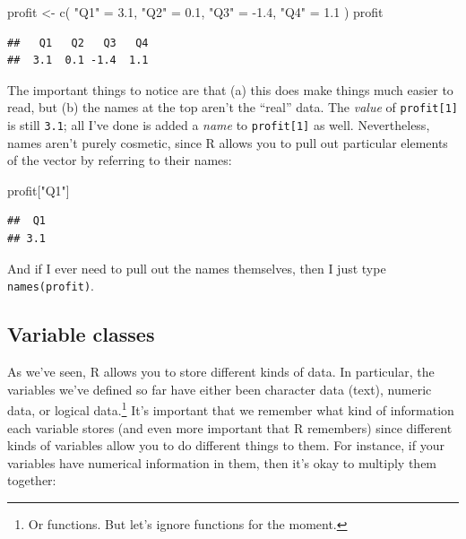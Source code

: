 \documentclass[
]{book}
\newenvironment{Shaded}{\begin{snugshade}}{\end{snugshade}}
\newcommand{\FloatTok}[1]{\textcolor[rgb]{0.00,0.00,0.81}{#1}}
\newcommand{\FunctionTok}[1]{\textcolor[rgb]{0.00,0.00,0.00}{#1}}
\newcommand{\NormalTok}[1]{#1}
\newcommand{\OtherTok}[1]{\textcolor[rgb]{0.56,0.35,0.01}{#1}}
\newcommand{\SpecialCharTok}[1]{\textcolor[rgb]{0.00,0.00,0.00}{#1}}
\newcommand{\StringTok}[1]{\textcolor[rgb]{0.31,0.60,0.02}{#1}}
\begin{document}
\begin{Shaded}
\begin{Highlighting}[]
\NormalTok{profit }\OtherTok{\textless{}{-}} \FunctionTok{c}\NormalTok{( }\StringTok{"Q1"} \OtherTok{=} \FloatTok{3.1}\NormalTok{, }\StringTok{"Q2"} \OtherTok{=} \FloatTok{0.1}\NormalTok{, }\StringTok{"Q3"} \OtherTok{=} \SpecialCharTok{{-}}\FloatTok{1.4}\NormalTok{, }\StringTok{"Q4"} \OtherTok{=} \FloatTok{1.1}\NormalTok{ )}
\NormalTok{profit}
\end{Highlighting}
\end{Shaded}

\begin{verbatim}
##   Q1   Q2   Q3   Q4 
##  3.1  0.1 -1.4  1.1
\end{verbatim}

The important things to notice are that (a) this does make things much easier to read, but (b) the names at the top aren't the ``real'' data. The \emph{value} of \texttt{profit{[}1{]}} is still \texttt{3.1}; all I've done is added a \emph{name} to \texttt{profit{[}1{]}} as well. Nevertheless, names aren't purely cosmetic, since R allows you to pull out particular elements of the vector by referring to their names:

\begin{Shaded}
\begin{Highlighting}[]
\NormalTok{profit[}\StringTok{"Q1"}\NormalTok{]}
\end{Highlighting}
\end{Shaded}

\begin{verbatim}
##  Q1 
## 3.1
\end{verbatim}

And if I ever need to pull out the names themselves, then I just type \texttt{names(profit)}.

\hypertarget{variable-classes}{%
\subsection{Variable classes}\label{variable-classes}}

As we've seen, R allows you to store different kinds of data. In particular, the variables we've defined so far have either been character data (text), numeric data, or logical data.\footnote{Or functions. But let's ignore functions for the moment.} It's important that we remember what kind of information each variable stores (and even more important that R remembers) since different kinds of variables allow you to do different things to them. For instance, if your variables have numerical information in them, then it's okay to multiply them together:
\end{document}

